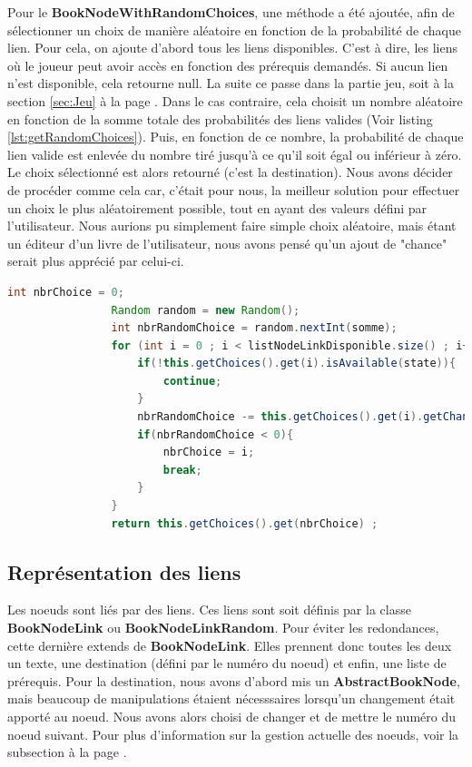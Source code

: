 			Pour le \textbf{BookNodeWithRandomChoices}, une méthode a été ajoutée, afin de sélectionner un choix de manière aléatoire en fonction de la probabilité de chaque lien. Pour cela, on ajoute d'abord tous les liens disponibles. C'est à dire, les liens où le joueur peut avoir accès en fonction des prérequis demandés. Si aucun lien n'est disponible, cela retourne null. La suite ce passe dans la partie jeu, soit à la section \ref{sec:Jeu} à la page \pageref{sec:Jeu}. Dans le cas contraire, cela choisit un nombre aléatoire en fonction de la somme totale des probabilités des liens valides (Voir listing \ref{lst:getRandomChoices}). Puis, en fonction de ce nombre, la probabilité de chaque lien valide est enlevée du nombre tiré jusqu'à ce qu'il soit égal ou inférieur à zéro. Le choix sélectionné est alors retourné (c'est la destination). Nous avons décider de procéder comme cela car, c'était pour nous, la meilleur solution pour effectuer un choix le plus aléatoirement possible, tout en ayant des valeurs défini par l'utilisateur. Nous aurions pu simplement faire simple choix aléatoire, mais étant un éditeur d'un livre de l'utilisateur, nous avons pensé qu'un ajout de "chance" serait plus apprécié par celui-ci.

			\begin{lstlisting}[gobble=12, language=java, label=lst:getRandomChoices, caption=getRandomChoice()]
				int nbrChoice = 0;
				Random random = new Random();
				int nbrRandomChoice = random.nextInt(somme);
				for (int i = 0 ; i < listNodeLinkDisponible.size() ; i++){
					if(!this.getChoices().get(i).isAvailable(state)){
						continue;
					}
					nbrRandomChoice -= this.getChoices().get(i).getChance();
					if(nbrRandomChoice < 0){
						nbrChoice = i;
						break;
					}
				}
				return this.getChoices().get(nbrChoice) ;
			\end{lstlisting}


		\subsection{Représentation des liens}\label{sub:liens}
			Les noeuds sont liés par des liens. Ces liens sont soit définis par la classe \textbf{BookNodeLink} ou \textbf{BookNodeLinkRandom}. Pour éviter les redondances, cette dernière extends de \textbf{BookNodeLink}. Elles prennent donc toutes les deux un texte, une destination (défini par le numéro du noeud) et enfin, une liste de prérequis. Pour la destination, nous avons d'abord mis un \textbf{AbstractBookNode}, mais beaucoup de manipulations étaient nécesssaires lorsqu'un changement était apporté au noeud. Nous avons alors choisi de changer et de mettre le numéro du noeud suivant. Pour plus d'information sur la gestion actuelle des noeuds, voir la subsection  à la page \pageref{book}.

